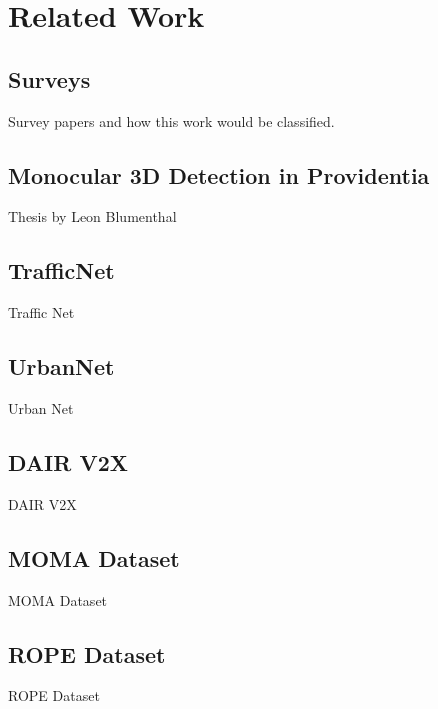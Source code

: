 
\chapter{Related Work}
\label{ch:related}

\section{Surveys}
\label{sec:surveys}

Survey papers and how this work would be classified.


\section{Monocular 3D Detection in Providentia}
\label{sec:leon}

Thesis by Leon Blumenthal


\section{TrafficNet}
\label{sec:trafficnet}

Traffic Net


\section{UrbanNet}
\label{sec:urbannet}

Urban Net


\section{DAIR V2X}
\label{sec:dair}

DAIR V2X


\section{MOMA Dataset}
\label{sec:moma}

MOMA Dataset

\section{ROPE Dataset}
\label{sec:rope}

ROPE Dataset


